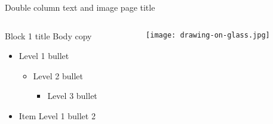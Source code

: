 \documentclass[t]{beamer}
\begin{document}
\begin{frame}{Double column text and image page title}
	\begin{columns}[T,totalwidth=\textwidth]
  		\begin{column}{0.45\textwidth}
  			\begin{block}{Block 1 title}
    				Body copy
    				\begin{itemize}    
    					\item Level 1 bullet
  					\begin{itemize}
  						\item Level 2 bullet
  						\begin{itemize}
  							\item Level 3 bullet
  						\end{itemize}
  					\end{itemize}
    					\item Item Level 1 bullet 2
    				\end{itemize}  
			\end{block}
  		\end{column} %
  		\begin{column}{0.45\textwidth}
			\begin{figure}
				\vspace{-\blocktitlesize}
				\texttt{[image: drawing-on-glass.jpg]}
			\end{figure}
  		\end{column}%
	\end{columns}
\end{frame}

\begin{frame}	
	\finalpage
\end{frame}
\end{document}
